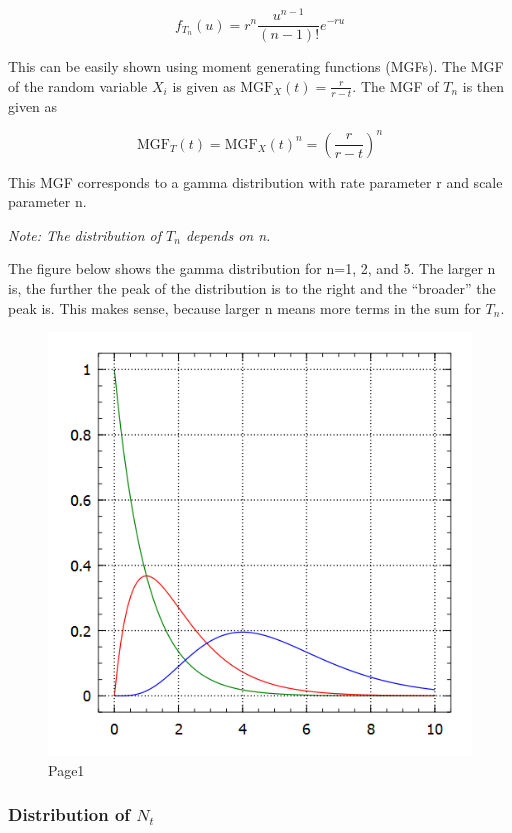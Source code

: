 \[ f_{T_n}(u) = r^n \frac{u^{n-1}}{(n-1)!}e^{-ru}\]

This can be easily shown using moment generating functions (MGFs). The
MGF of the random variable \(X_i\) is given as
\(\text{MGF}_X(t) = \frac{r}{r-t}\). The MGF of \(T_n\) is then given as

\[\text{MGF}_T(t) =  \text{MGF}_X(t)^n = \left( \frac{r}{r-t} \right)^n\]

This MGF corresponds to a gamma distribution with rate parameter r and
scale parameter n.

\emph{Note: The distribution of \(T_n\) depends on n.}

The figure below shows the gamma distribution for n=1, 2, and 5. The
larger n is, the further the peak of the distribution is to the right
and the ``broader'' the peak is. This makes sense, because larger n
means more terms in the sum for \(T_n\).

\begin{figure}[!hbt]
\centering
\includegraphics[scale=0.5]{images/gamma_dist_plot.png}
\caption{Page1}
\end{figure}

\subsubsection{\texorpdfstring{Distribution of
\(N_t\)}{Distribution of N\_t}}\label{distribution-of-n_t}

